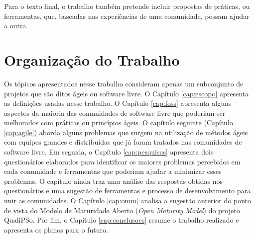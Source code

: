Para o texto final, o trabalho também pretende incluir propostas de
práticas, ou ferramentas, que, baseadas nas experiências de uma
comunidade, possam ajudar a outra.

\section{Organização do Trabalho}
\label{sec:organizacao_trabalho}

Os tópicos apresentados nesse trabalho consideram apenas um
subconjunto de projetos que são ditos ágeis ou software livre. O
Capítulo \ref{cap:escopo} apresenta as definições usadas nesse
trabalho. O Capítulo \ref{cap:foss} apresenta alguns aspectos da
maioria das comunidades de software livre que poderiam ser melhorados
com práticas ou princípios ágeis. O capítulo seguinte (Capítulo
\ref{cap:agile}) aborda alguns problemas que surgem na utilização de
métodos ágeis com equipes grandes e distribuídas que já foram tratados
nas comunidades de software livre. Em seguida, o Capítulo
\ref{cap:pesquisas} apresenta dois questionários elaborados para
identificar os maiores problemas percebidos em cada comunidade e
ferramentas que poderiam ajudar a minimizar esses problemas. O
capítulo ainda traz uma análise das respostas obtidas nos
questionários e uma sugestão de ferramentas e processo de
desenvolvimento para unir as comunidades.  O Capítulo \ref{cap:omm}
analisa a sugestão anterior do ponto de vista do Modelo de Maturidade
Aberto ({\it Open Maturity Model}) do projeto QualiPSo.  Por fim, o
Capítulo \ref{cap:conclusoes} resume o trabalho realizado e apresenta
os planos para o futuro.
